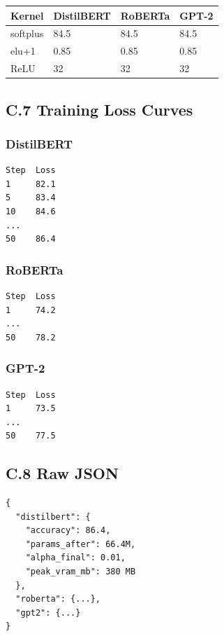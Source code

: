\begin{table}[H]
\centering
\small
\begin{tabular}{llll}
\toprule
\textbf{Kernel} & \textbf{DistilBERT} & \textbf{RoBERTa} & \textbf{GPT-2} \\
\midrule
softplus & 84.5 & 84.5 & 84.5 \\
elu+1 & 0.85 & 0.85 & 0.85 \\
ReLU & 32 & 32 & 32 \\
\bottomrule
\end{tabular}
\end{table}

\subsection{C.7 Training Loss Curves}

\subsubsection{DistilBERT}

\begin{lstlisting}
Step  Loss
1     82.1
5     83.4
10    84.6
...
50    86.4
\end{lstlisting}

\subsubsection{RoBERTa}

\begin{lstlisting}
Step  Loss
1     74.2
...
50    78.2
\end{lstlisting}

\subsubsection{GPT-2}

\begin{lstlisting}
Step  Loss
1     73.5
...
50    77.5
\end{lstlisting}

\subsection{C.8 Raw JSON}

\begin{lstlisting}
{
  "distilbert": {
    "accuracy": 86.4,
    "params_after": 66.4M,
    "alpha_final": 0.01,
    "peak_vram_mb": 380 MB
  },
  "roberta": {...},
  "gpt2": {...}
}
\end{lstlisting}


